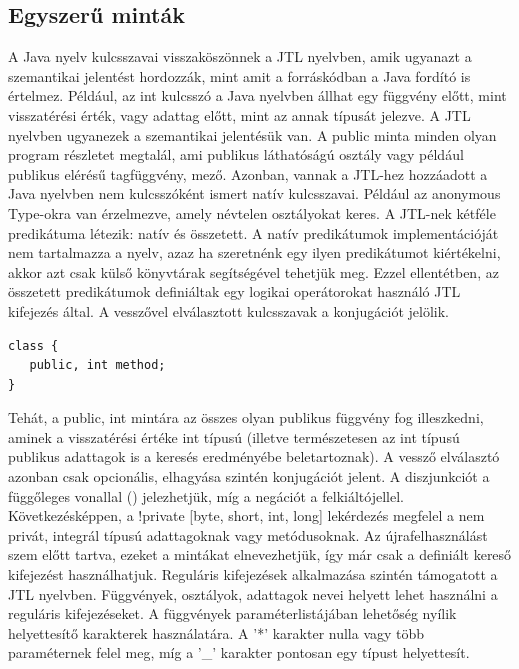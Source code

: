 \documentclass[a4paper,12pt]{report}
\begin{document}
\subsection{Egyszerű minták}
\par A Java nyelv kulcsszavai visszaköszönnek a JTL nyelvben, amik ugyanazt a szemantikai jelentést hordozzák, mint amit a forráskódban a Java fordító is értelmez. Például, az int kulcsszó a Java nyelvben állhat egy függvény előtt, mint visszatérési érték, vagy adattag előtt, mint az annak típusát jelezve. A JTL nyelvben ugyanezek a szemantikai jelentésük van. A public minta minden olyan program részletet megtalál, ami publikus láthatóságú osztály vagy például publikus elérésű tagfüggvény, mező. Azonban, vannak a JTL-hez hozzáadott a Java nyelvben nem kulcsszóként ismert natív kulcsszavai. Például az anonymous Type-okra van érzelmezve, amely névtelen osztályokat keres. A JTL-nek kétféle predikátuma létezik: natív és összetett. A natív predikátumok implementációját nem tartalmazza a nyelv, azaz ha szeretnénk egy ilyen predikátumot kiértékelni, akkor azt csak külső könyvtárak segítségével tehetjük meg. Ezzel ellentétben, az összetett predikátumok definiáltak egy logikai operátorokat használó JTL kifejezés által. A vesszővel elválasztott kulcsszavak a konjugációt jelölik. 
\begin{verbatim}
class {
   public, int method;
}
\end{verbatim}
Tehát, a public, int mintára az összes olyan publikus függvény fog illeszkedni, aminek a visszatérési értéke int típusú (illetve természetesen az int típusú publikus adattagok is a keresés eredményébe beletartoznak). A vessző elválasztó azonban csak opcionális, elhagyása szintén konjugációt jelent. A diszjunkciót a függőleges vonallal (\textpipe) jelezhetjük, míg a negációt a felkiáltójellel. Következésképpen, a !private [byte, short, int, long] lekérdezés megfelel a nem privát, integrál típusú adattagoknak vagy metódusoknak. Az újrafelhasználást szem előtt tartva, ezeket a mintákat elnevezhetjük, így már csak a definiált kereső kifejezést használhatjuk. Reguláris kifejezések alkalmazása szintén támogatott a JTL nyelvben. Függvények, osztályok, adattagok nevei helyett lehet használni a reguláris kifejezéseket. A függvények paraméterlistájában lehetőség nyílik helyettesítő karakterek használatára. A ’*’ karakter nulla vagy több paraméternek felel meg, míg a ’\_’ karakter pontosan egy típust helyettesít.
\end{document}
